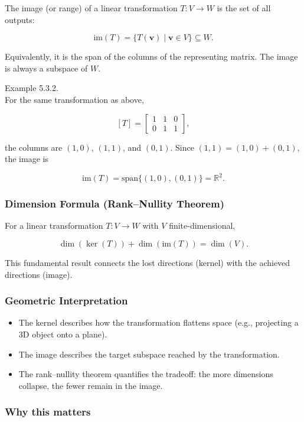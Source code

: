 \documentclass[
  12pt,
  a4paper,
]{article}
\begin{document}
The image (or range) of a linear transformation \(T: V \to W\) is the
set of all outputs:

\[\text{im}(T) = \{ T(\mathbf{v}) \mid \mathbf{v} \in V \} \subseteq W.\]

Equivalently, it is the span of the columns of the representing matrix.
The image is always a subspace of \(W\).

Example 5.3.2.\\
For the same transformation as above,

\[[T] = \begin{bmatrix}
1 & 1 & 0 \\
0 & 1 & 1
\end{bmatrix},\]

the columns are \((1,0)\), \((1,1)\), and \((0,1)\). Since
\((1,1) = (1,0) + (0,1)\), the image is

\[\text{im}(T) = \text{span}\{ (1,0), (0,1) \} = \mathbb{R}^2.\]

\subsubsection{Dimension Formula (Rank--Nullity
Theorem)}\label{dimension-formula-rank--nullity-theorem}

For a linear transformation \(T: V \to W\) with \(V\)
finite-dimensional,

\[\dim(\ker(T)) + \dim(\text{im}(T)) = \dim(V).\]

This fundamental result connects the lost directions (kernel) with the
achieved directions (image).

\subsubsection{Geometric
Interpretation}\label{geometric-interpretation-10}

\begin{itemize}
\item
  The kernel describes how the transformation flattens space (e.g.,
  projecting a 3D object onto a plane).
\item
  The image describes the target subspace reached by the transformation.
\item
  The rank--nullity theorem quantifies the tradeoff: the more dimensions
  collapse, the fewer remain in the image.
\end{itemize}

\subsubsection{Why this matters}\label{why-this-matters-18}
\end{document}
